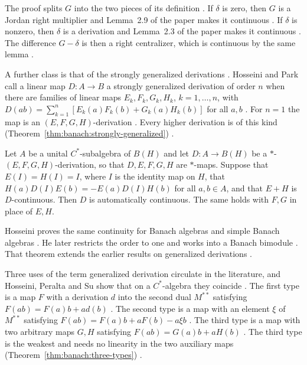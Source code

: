 The proof splits $G$ into the two pieces of its definition
\cite[p.~223]{Ali2011GeneralizedLeft}. If $\delta$ is zero, then $G$ is a
Jordan right multiplier and Lemma~2.9 of the paper makes it continuous
\cite[p.~223]{Ali2011GeneralizedLeft}. If $\delta$ is nonzero, then $\delta$
is a derivation and Lemma~2.3 of the paper makes it continuous
\cite[p.~223]{Ali2011GeneralizedLeft}. The difference $G-\delta$ is then a
right centralizer, which is continuous by the same lemma
\cite[p.~223]{Ali2011GeneralizedLeft}.

A further class is that of the strongly generalized derivations
\cite[Definition~2.1, p.~3]{HosseiniPark2023}. Hosseini and Park call a linear
map $D\colon A\to B$ a strongly generalized derivation of order $n$ when there
are families of linear maps $E_{k},F_{k},G_{k},H_{k}$, $k=1,\dots,n$, with
$D(ab)=\sum_{k=1}^{n}[E_{k}(a)F_{k}(b)+G_{k}(a)H_{k}(b)]$ for all $a,b$
\cite[Definition~2.1, p.~3]{HosseiniPark2023}. For $n=1$ the map is an
$(E,F,G,H)$-derivation \cite[p.~3]{HosseiniPark2023}. Every higher derivation
is of this kind (Theorem~\ref{thm:banach:strongly-generalized})
\cite[Example~2.3, p.~4]{HosseiniPark2023}.

\begin{theorem}\label{thm:banach:strongly-generalized}
Let $A$ be a unital $C^*$-subalgebra of $B(H)$ and let $D\colon A\to B(H)$ be
a $*$-$(E,F,G,H)$-derivation, so that $D,E,F,G,H$ are $*$-maps. Suppose that
$E(I)=H(I)=I$, where $I$ is the identity map on $H$, that
$H(a)D(I)E(b)=-E(a)D(I)H(b)$ for all $a,b\in A$, and that $E+H$ is
$D$-continuous. Then $D$ is automatically continuous. The same holds with
$F,G$ in place of $E,H$.
\end{theorem}

Hosseini proves the same continuity for Banach algebras and simple Banach
algebras \cite[Theorems~2.11--2.12, p.~7]{HosseiniPark2023}. He later
restricts the order to one and works into a Banach bimodule
\cite[Theorem~2.1, p.~5]{Hosseini2025Strongly}. That theorem extends the
earlier results on generalized derivations
\cite[p.~1]{Hosseini2025Strongly}.

Three uses of the term generalized derivation circulate in the literature, and
Hosseini, Peralta and Su show that on a $C^*$-algebra they coincide
\cite[p.~1]{HosseiniPeraltaSu2025}. The first type is a map $F$ with a
derivation $d$ into the second dual $M^{**}$ satisfying $F(ab)=F(a)b+ad(b)$
\cite[p.~1]{HosseiniPeraltaSu2025}. The second type is a map with an element
$\xi$ of $M^{**}$ satisfying $F(ab)=F(a)b+aF(b)-a\xi b$
\cite[p.~1]{HosseiniPeraltaSu2025}. The third type is a map with two arbitrary
maps $G,H$ satisfying $F(ab)=G(a)b+aH(b)$ \cite[p.~1]{HosseiniPeraltaSu2025}.
The third type is the weakest and needs no linearity in the two auxiliary maps
(Theorem~\ref{thm:banach:three-types}) \cite[p.~2]{HosseiniPeraltaSu2025}.

